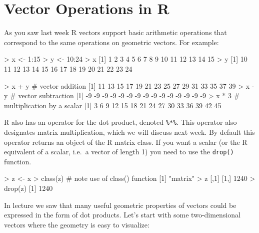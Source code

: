 
\section{Vector Operations in R}

As you saw last week R vectors support basic arithmetic operations that
correspond to the same operations on geometric vectors. For example:
%
\begin{R}
> x <- 1:15
> y <- 10:24
> x
 [1]  1  2  3  4  5  6  7  8  9 10 11 12 13 14 15
> y
 [1] 10 11 12 13 14 15 16 17 18 19 20 21 22 23 24

> x + y             # vector addition
 [1] 11 13 15 17 19 21 23 25 27 29 31 33 35 37 39
> x - y             # vector subtraction
 [1] -9 -9 -9 -9 -9 -9 -9 -9 -9 -9 -9 -9 -9 -9 -9
> x * 3             # multiplication by a scalar
 [1]  3  6  9 12 15 18 21 24 27 30 33 36 39 42 45
\end{R}
%
R also has an operator for the dot product, denoted \lstinline!%*%!.
This operator also designates matrix multiplication, which we will
discuss next week. By default this operator returns an object of the R
matrix class. If you want a scalar (or the R equivalent of a scalar,
i.e.~a vector of length 1) you need to use the \lstinline!drop()!
function.

\begin{R}
> z <- x %
> class(z)      # note use of class() function
[1] "matrix"
> z
     [,1]
[1,] 1240
> drop(z)
[1] 1240
\end{R}

In lecture we saw that many useful geometric properties of vectors could be expressed in the form of dot products. Let's start with some two-dimensional vectors where the geometry is  easy to visualize:

